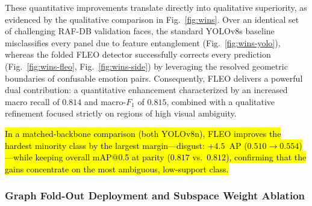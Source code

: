 \documentclass[algorithms,article,submit,moreauthors]{Definitions/mdpi}
\newcommand{\rev}[1]{\hl{#1}}
\begin{document}
These quantitative improvements translate directly into qualitative superiority, as evidenced by the qualitative comparison in Fig.~\ref{fig:wins}. Over an identical set of challenging RAF-DB validation faces, the standard YOLOv8s baseline misclassifies every panel due to feature entanglement (Fig.~\ref{fig:wins-yolo}), whereas the folded FLEO detector successfully corrects every prediction (Fig.~\ref{fig:wins-fleo}, Fig.~\ref{fig:wins-side}) by leveraging the resolved geometric boundaries of confusable emotion pairs. Consequently, FLEO delivers a powerful dual contribution: a quantitative enhancement characterized by an increased macro recall of $0.814$ and macro-$F_1$ of $0.815$, combined with a qualitative refinement focused strictly on regions of high visual ambiguity.

\rev{In a matched-backbone comparison (both YOLOv8n), FLEO improves the hardest minority class by the largest margin---disgust: \mbox{$+4.5$}~AP (\mbox{$0.510 \rightarrow 0.554$})---while keeping overall mAP@0.5 at parity (\mbox{$0.817$} vs.\ \mbox{$0.812$}), confirming that the gains concentrate on the most ambiguous, low-support class.}



\subsubsection{Graph Fold-Out Deployment and Subspace Weight Ablation}
\label{sec:foldresult}
\end{document}
